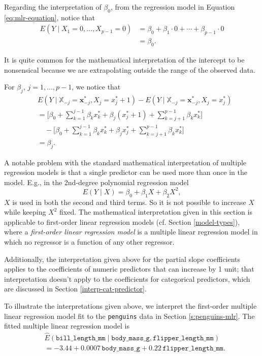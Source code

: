 \documentclass[
]{book}
\theoremstyle{definition}
\theoremstyle{definition}
\theoremstyle{definition}
\theoremstyle{definition}
\theoremstyle{remark}
\begin{document}
Regarding the interpretation of \(\beta_0\), from the regression model in
Equation \eqref{eq:mlr-equation}, notice that \[
\begin{aligned}
E(Y\mid X_1=0,\ldots,X_{p-1}=0) &= \beta_0 + \beta_1 \cdot 0 + \cdots + \beta_{p-1} \cdot 0\\
&= \beta_0.
\end{aligned}
\]

It is quite common for the mathematical interpretation of the intercept
to be nonsensical because we are extrapolating outside the range of the
observed data.

For \(\beta_j\), \(j = 1,\ldots, p-1\), we notice that \[
\begin{aligned}
& E(Y\mid \mathbb{X}_{-j} = \mathbf{x}^*_{-j}, X_j = x_{j}^*+1)-E(Y\mid \mathbb{X}_{-j} = \mathbf{x}^*_{-j}, X_j = x_{j}^*)\\
&=  \biggl[\beta_0 + \sum_{k=1}^{j-1}\beta_kx^*_k + \beta_j(x^*_j+1) + \sum_{k=j+1}^{p-1}\beta_kx^*_k\biggl] \\
&\quad -\biggl[\beta_0 + \sum_{k=1}^{j-1}\beta_kx^*_k + \beta_jx^*_j + \sum_{k=j+1}^{p-1}\beta_kx^*_k\biggl]\\
&= \beta_j.
\end{aligned}
\]

A notable problem with the standard mathematical interpretation of
multiple regression models is that a single predictor can be used more
than once in the model. E.g., in the 2nd-degree polynomial regression
model \[E(Y\mid X) = \beta_0 + \beta_1 X + \beta_2 X^2,\] \(X\) is used in
both the second and third terms. So it is not possible to increase \(X\)
while keeping \(X^2\) fixed. The mathematical interpretation given in this
section is applicable to first-order linear regression models (cf.
Section \ref{model-types}), where a \emph{first-order linear regression
model} is a multiple linear regression model in which no regressor is a
function of any other regressor.

Additionally, the interpretation given above for the partial slope
coefficients applies to the coefficients of numeric predictors that can
increase by 1 unit; that interpretation doesn't apply to the
coefficients for categorical predictors, which are discussed in Section
\ref{interp-cat-predictor}.

To illustrate the interpretations given above, we interpret the
first-order multiple linear regression model fit to the \texttt{penguins} data
in Section \ref{s:penguins-mlr}. The fitted multiple linear regression
model is \[
\begin{aligned}
&\hat{E}(\mathtt{bill\_length\_mm}\mid \mathtt{body\_mass\_g}, \mathtt{flipper\_length\_mm})\\
&=-3.44+0.0007 \,\mathtt{body\_mass\_g}+0.22\,\mathtt{flipper\_length\_mm}.
\end{aligned}
\label{eq:mlr-penguins-interp}
\]
\end{document}
